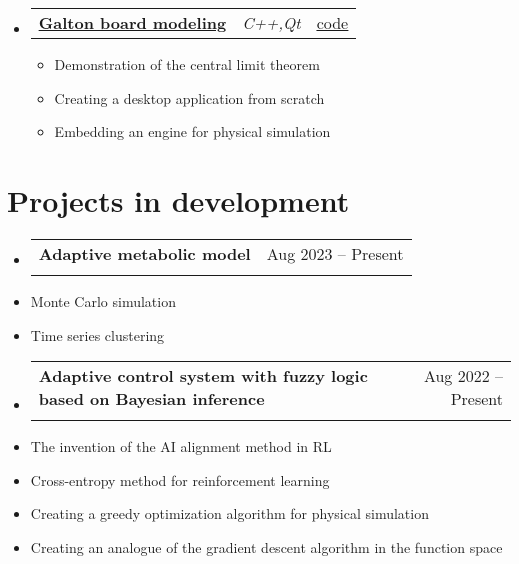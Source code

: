 \documentclass[a4paper,11pt]{article}
\makeatletter
\newcommand{\resumeItem}[1]{
  \item\small{#1}
}
\newcommand{\resumeItemListStart}{\begin{itemize}[rightmargin=0.11in]}
\newcommand{\resumeItemListEnd}{\end{itemize}}
\newcommand{\resumeTrioHeading}[3]{
  \item\small{
    \begin{tabular*}{0.96\textwidth}[t]{
      l@{\extracolsep{\fill}}c@{\extracolsep{\fill}}r
    }
      \textbf{#1} & \textit{#2} & #3
    \end{tabular*}
  }
}
\newcommand{\resumeQuadHeading}[4]{
  \item
  \begin{tabular*}{0.96\textwidth}[t]{l@{\extracolsep{\fill}}r}
    \textbf{#1} & #2 \\
    \textit{\small#3} & \textit{\small #4} \\
  \end{tabular*}
}
\newcommand{\resumeHeadingListStart}{
  \begin{itemize}[leftmargin=0.15in, label={}]
}
\newcommand{\resumeHeadingListEnd}{\end{itemize}}
\makeatother
\begin{document}
\resumeHeadingListStart{}
    \resumeTrioHeading{\href{https://youtu.be/vKb5lqeu0dQ?si=cGm2u1DfZwwj2dD5}{\uline{\faIcon{youtube} Galton board modeling}}}{C++,Qt}{\href{https://github.com/RepnikovPavel/Galtons-desk-with-box2d-and-qt-on-cpp}{\uline{\faGithubSquare code}}}
        \resumeItemListStart{}
          \resumeItem{Demonstration of the central limit theorem}
          \resumeItem{Creating a desktop application from scratch}
          \resumeItem{Embedding an engine for physical simulation}
        \resumeItemListEnd{}
    \resumeHeadingListEnd







\section{Projects in development}  

\resumeHeadingListStart{}
\resumeQuadHeading{Adaptive metabolic model}{Aug 2023 -- Present}{}{}
\resumeHeadingListEnd

\resumeItemListStart{}
\resumeItem{Monte Carlo simulation}
\resumeItem{Time series clustering}
\resumeItemListEnd

\resumeHeadingListStart{}
\resumeQuadHeading{Adaptive control system with fuzzy logic based on Bayesian inference}{Aug 2022 -- Present}{}{}
\resumeHeadingListEnd

\resumeItemListStart{}
\resumeItem{The invention of the AI alignment method in RL}
\resumeItem{Cross-entropy method for reinforcement learning}
\resumeItem{Creating a greedy optimization algorithm for physical simulation}
\resumeItem{Creating an analogue of the gradient descent algorithm in the function space}
\resumeItemListEnd{}
\end{document}
